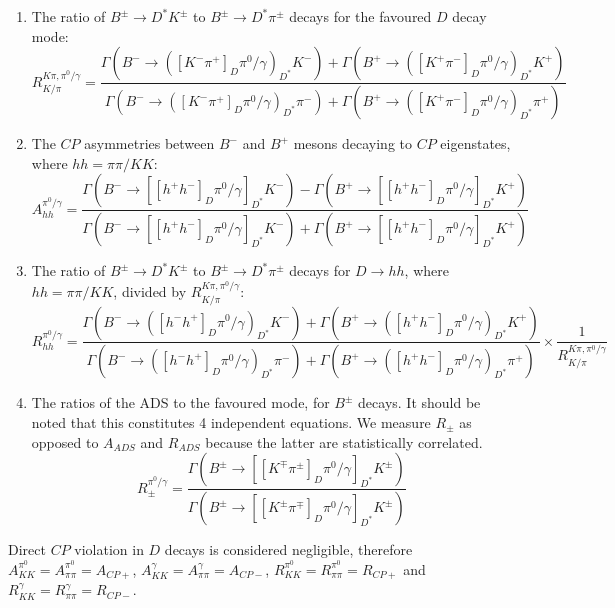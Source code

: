 \documentclass[oneside,12pt]{article}
\begin{document}
\begin{enumerate}
  \item The ratio of $B^{\pm} \rightarrow D^* K^{\pm}$ to $B^{\pm} \rightarrow
    D^* \pi^{\pm}$ decays for the favoured $D$ decay mode:
    \begin{equation}
      R^{K\pi , \pi^0 /\gamma}_{K/\pi}=\frac{\Gamma(B^{-}\rightarrow
        ([K^{-}\pi^{+}]_D\pi^0 /\gamma)_{D^*}K^{-})+\Gamma(B^{+}\rightarrow
      ([K^{+}\pi^{-}]_D\pi^0 /\gamma)_{D^*}K^{+})}{\Gamma(B^{-}\rightarrow
        ([K^{-}\pi^{+}]_D\pi^0 /\gamma)_{D^*}\pi^{-})+\Gamma(B^{+}\rightarrow
      ([K^{+}\pi^{-}]_D\pi^0 /\gamma)_{D^*}\pi^{+})}
      \label{eq:R_DstK_Dstpi}
    \end{equation}
  \item The $CP$ asymmetries between $B^{-}$ and $B^{+}$ mesons decaying to $CP$
    eigenstates, where $hh=\pi \pi /KK$:
    \begin{equation}
      A_{hh}^{\pi^{0}/\gamma}=\frac{\Gamma(B^{-}\rightarrow
        [[h^{+}h^{-}]_{D}\pi^{0}/\gamma]_{D^{*}}K^{-})-\Gamma(B^{+}\rightarrow
      [[h^{+}h^{-}]_{D}\pi^{0}/\gamma]_{D^{*}}K^{+})}{\Gamma(B^{-}\rightarrow
        [[h^{+}h^{-}]_{D}\pi^{0}/\gamma]_{D^{*}}K^{-})+\Gamma(B^{+}\rightarrow
      [[h^{+}h^{-}]_{D}\pi^{0}/\gamma]_{D^{*}}K^{+})} \label{eq:Aglw}
    \end{equation}
  \item The ratio of $B^{\pm} \rightarrow D^* K^{\pm}$ to $B^{\pm} \rightarrow
    D^* \pi^{\pm}$ decays for $D\rightarrow hh$, where $hh=\pi \pi /KK$, divided
    by $R^{K\pi , \pi^0 /\gamma}_{K/\pi}$:
    \begin{equation}
      R_{hh}^{\pi^{0}/\gamma}=\frac{\Gamma(B^{-}\rightarrow
        ([h^{-}h^{+}]_D\pi^0 /\gamma)_{D^*}K^{-})+\Gamma(B^{+}\rightarrow
      ([h^{+}h^{-}]_D\pi^0 /\gamma)_{D^*}K^{+})}{\Gamma(B^{-}\rightarrow
        ([h^{-}h^{+}]_D\pi^0 /\gamma)_{D^*}\pi^{-})+\Gamma(B^{+}\rightarrow
      ([h^{+}h^{-}]_D\pi^0 /\gamma)_{D^*}\pi^{+})} \times \frac{1}{R^{K\pi ,
      \pi^0 /\gamma}_{K/\pi}}
    \end{equation}
  \item The ratios of the ADS to the favoured mode, for $B^{\pm}$ decays. It
    should be noted that this constitutes 4 independent equations. We measure
    $R_{\pm}$ as opposed to $A_{ADS}$ and $R_{ADS}$ because the latter are
    statistically correlated. 
    \begin{equation}
      R_{\pm}^{\pi^{0}/\gamma}=\frac{\Gamma(B^{\pm}\rightarrow
      [[K^{\mp}\pi^{\pm}]_{D}\pi^{0}/\gamma]_{D^{*}}K^{\pm})}{\Gamma(B^{\pm}\rightarrow
      [[K^{\pm}\pi^{\mp}]_{D}\pi^{0}/\gamma]_{D^{*}}K^{\pm})} \label{eq:Rads}
    \end{equation}
\end{enumerate}
\noindent Direct $CP$ violation in $D$ decays is considered negligible, therefore
$A_{KK}^{\pi^{0}}=A_{\pi\pi}^{\pi^{0}}=A_{CP+}$,
$A_{KK}^{\gamma}=A_{\pi\pi}^{\gamma}=A_{CP-}$,
$R_{KK}^{\pi^{0}}=R_{\pi\pi}^{\pi^{0}}=R_{CP+}$ and
$R_{KK}^{\gamma}=R_{\pi\pi}^{\gamma}=R_{CP-}$.
\end{document}
